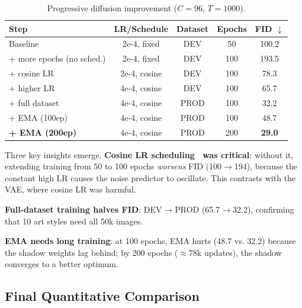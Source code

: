 \documentclass[runningheads]{llncs}
\begin{document}
\begin{table}[htbp]
\caption{Progressive diffusion improvement ($C=96$, $T=1000$).}\label{tab:diff_path}
\centering\small
\begin{tabular}{lcccc}
\toprule
Step & LR/Schedule & Dataset & Epochs & FID $\downarrow$ \\
\midrule
Baseline & 2e-4, fixed & DEV & 50 & 100.2 \\
+ more epochs (no sched.) & 2e-4, fixed & DEV & 100 & 193.5 \\
+ cosine LR & 2e-4, cosine & DEV & 100 & 78.3 \\
+ higher LR & 4e-4, cosine & DEV & 100 & 65.7 \\
+ full dataset & 4e-4, cosine & PROD & 100 & 32.2 \\
+ EMA (100ep) & 4e-4, cosine & PROD & 100 & 48.7 \\
\textbf{+ EMA (200ep)} & 4e-4, cosine & PROD & 200 & \textbf{29.0} \\
\bottomrule
\end{tabular}
\end{table}

Three key insights emerge. \textbf{Cosine LR scheduling~\cite{loshchilov2017} was critical}: without it, extending training from 50 to 100 epochs \emph{worsens} FID (100$\to$194), because the constant high LR causes the noise predictor to oscillate. This contrasts with the VAE, where cosine LR was harmful.

\textbf{Full-dataset training halves FID}: DEV$\to$PROD (65.7$\to$32.2), confirming that 10 art styles need all 50k images.

\textbf{EMA needs long training}: at 100 epochs, EMA hurts (48.7 vs. 32.2) because the shadow weights lag behind; by 200 epochs ($\approx$78k updates), the shadow converges to a better optimum.

\subsection{Final Quantitative Comparison}\label{sec:final}
\end{document}
